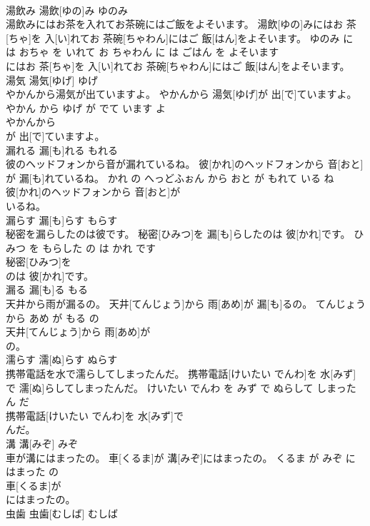\documentclass[8pt]{extreport}
\begin{document}
\begin{CJK}{UTF8}{min}
\\	湯飲み	湯飲[ゆの]み	ゆのみ	
\\	湯飲みにはお茶を入れてお茶碗にはご飯をよそいます。	湯飲[ゆの]みにはお 茶[ちゃ]を 入[い]れてお 茶碗[ちゃわん]にはご 飯[はん]をよそいます。	ゆのみ に は おちゃ を いれて お ちゃわん に は ごはん を よそいます	
\\	にはお 茶[ちゃ]を 入[い]れてお 茶碗[ちゃわん]にはご 飯[はん]をよそいます。			
\\	湯気	湯気[ゆげ]	ゆげ	
\\	やかんから湯気が出ていますよ。	やかんから 湯気[ゆげ]が 出[で]ていますよ。	やかん から ゆげ が でて います よ	
\\	やかんから
\\	が 出[で]ていますよ。			
\\	漏れる	漏[も]れる	もれる	
\\	彼のヘッドフォンから音が漏れているね。	彼[かれ]のヘッドフォンから 音[おと]が 漏[も]れているね。	かれ の へっどふぉん から おと が もれて いる ね	
\\	彼[かれ]のヘッドフォンから 音[おと]が
\\	いるね。			
\\	漏らす	漏[も]らす	もらす	
\\	秘密を漏らしたのは彼です。	秘密[ひみつ]を 漏[も]らしたのは 彼[かれ]です。	ひみつ を もらした の は かれ です	
\\	秘密[ひみつ]を
\\	のは 彼[かれ]です。			
\\	漏る	漏[も]る	もる	
\\	天井から雨が漏るの。	天井[てんじょう]から 雨[あめ]が 漏[も]るの。	てんじょう から あめ が もる の	
\\	天井[てんじょう]から 雨[あめ]が
\\	の。			
\\	濡らす	濡[ぬ]らす	ぬらす	
\\	携帯電話を水で濡らしてしまったんだ。	携帯電話[けいたい でんわ]を 水[みず]で 濡[ぬ]らしてしまったんだ。	けいたい でんわ を みず で ぬらして しまった ん だ	
\\	携帯電話[けいたい でんわ]を 水[みず]で
\\	んだ。			
\\	溝	溝[みぞ]	みぞ	
\\	車が溝にはまったの。	車[くるま]が 溝[みぞ]にはまったの。	くるま が みぞ に はまった の	
\\	車[くるま]が
\\	にはまったの。			
\\	虫歯	虫歯[むしば]	むしば	

\end{CJK}
\end{document}
